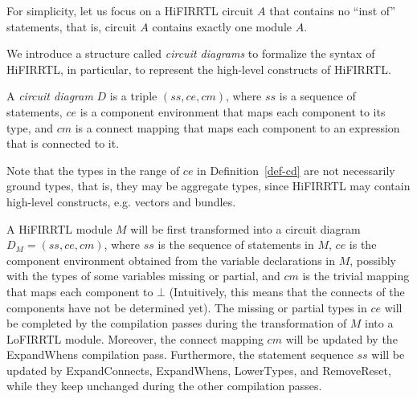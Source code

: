 
For simplicity, let us focus on a HiFIRRTL circuit $A$ that contains no ``inst of'' statements, that is, circuit $A$ contains exactly one module $A$.

We introduce a structure called \emph{circuit diagrams} to formalize the syntax of HiFIRRTL, in particular, to represent the high-level constructs of HiFIRRTL.   

\begin{definition}\label{def-cd}
A \emph{circuit diagram} $D$ is a triple $(ss, ce, cm)$, where $ss$ is a sequence of statements, $ce$ is a component environment that maps each component to its type, and $cm$ is a connect mapping that maps each component to an expression that is connected to it. 
\end{definition}
Note that the types in the range of $ce$ in Definition~\ref{def-cd} are not necessarily ground types, that is, they may be aggregate types, since HiFIRRTL may contain high-level constructs, e.g. vectors and bundles.  

A HiFIRRTL module $M$ will be first transformed into a circuit diagram $D_M = (ss, ce, cm)$, where $ss$ is the sequence of statements in $M$, $ce$ is the component environment obtained from the variable declarations in $M$, possibly with the types of some variables missing or partial, and $cm$ is the trivial mapping that maps each component to $\bot$ (Intuitively, this means that the connects of the components have not be determined yet). The missing or partial  types in $ce$ will be completed by the compilation passes during the transformation of $M$ into a LoFIRRTL module. Moreover, the connect mapping $cm$ will be updated by the ExpandWhens compilation pass. Furthermore, the statement sequence $ss$ will be updated by ExpandConnects, ExpandWhens, LowerTypes, and RemoveReset, while they keep unchanged during the other compilation passes.  

